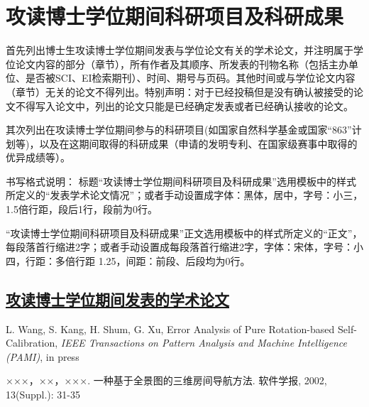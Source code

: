 
%
%

\chapter*{\hfill 攻读博士学位期间科研项目及科研成果 \hfill}
首先列出博士生攻读博士学位期间发表与学位论文有关的学术论文，并注明属于学位论文内容的部分（章节），所有作者及其顺序、所发表的刊物名称（包括主办单位、是否被SCI、EI检索期刊）、时间、期号与页码。其他时间或与学位论文内容（章节）无关的论文不得列出。特别声明：对于已经投稿但是没有确认被接受的论文不得写入论文中，列出的论文只能是已经确定发表或者已经确认接收的论文。

其次列出在攻读博士学位期间参与的科研项目(如国家自然科学基金或国家“863”计划等)，以及在这期间取得的科研成果（申请的发明专利、在国家级赛事中取得的优异成绩等）。

书写格式说明：
标题“攻读博士学位期间科研项目及科研成果”选用模板中的样式所定义的“发表学术论文情况”；或者手动设置成字体：黑体，居中，字号：小三，1.5倍行距，段后1行，段前为0行。

“攻读博士学位期间科研项目及科研成果”正文选用模板中的样式所定义的“正文”，每段落首行缩进2字；或者手动设置成每段落首行缩进2字，字体：宋体，字号：小四，行距：多倍行距 1.25，间距：前段、后段均为0行。





\section*{\underline{攻读博士学位期间发表的学术论文}}
\begin{publist}
\item L. Wang, S. Kang, H. Shum, G. Xu, Error Analysis of Pure
  Rotation-based Self-Calibration, {\em{IEEE Transactions on Pattern
      Analysis and Machine Intelligence (PAMI)}}, in press
\item ×××，××，×××. 一种基于全景图的三维房间导航方法.
  软件学报, 2002, 13(Suppl.): 31-35
\end{publist}


